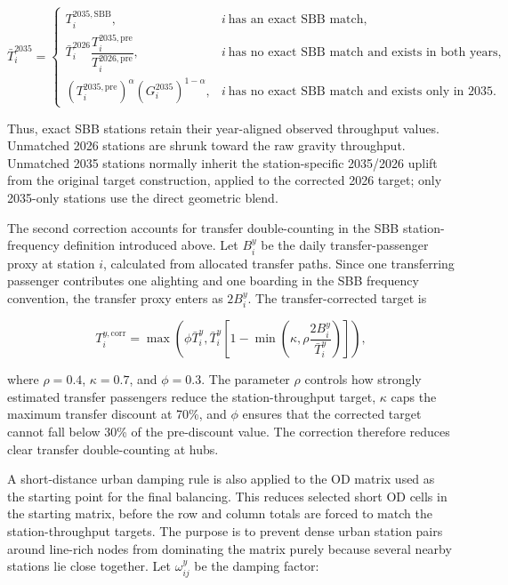 \documentclass[preprint,12pt]{elsarticle}
\begin{document}
\begin{equation}
\bar T_i^{2035}
=
\begin{cases}
T_i^{2035,\mathrm{SBB}}, & i\ \text{has an exact SBB match},\\[4pt]
\bar T_i^{2026}
\dfrac{T_i^{2035,\mathrm{pre}}}{T_i^{2026,\mathrm{pre}}},
& i\ \text{has no exact SBB match and exists in both years},\\[10pt]
\left(T_i^{2035,\mathrm{pre}}\right)^\alpha
\left(G_i^{2035}\right)^{1-\alpha},
& i\ \text{has no exact SBB match and exists only in 2035}.
\end{cases}
\label{eq:part2-unmatched-target-2035}
\end{equation}

Thus, exact SBB stations retain their year-aligned observed throughput values. Unmatched 2026 stations are shrunk toward the raw gravity throughput. Unmatched 2035 stations normally inherit the station-specific 2035/2026 uplift from the original target construction, applied to the corrected 2026 target; only 2035-only stations use the direct geometric blend.

The second correction accounts for transfer double-counting in the SBB station-frequency definition introduced above. Let \(B_i^y\) be the daily transfer-passenger proxy at station \(i\), calculated from allocated transfer paths. Since one transferring passenger contributes one alighting and one boarding in the SBB frequency convention, the transfer proxy enters as \(2B_i^y\). The transfer-corrected target is

\begin{equation}
T_i^{y,\mathrm{corr}}
=
\max\left(
\phi\bar T_i^y,
\bar T_i^y\left[
1-
\min\left(
\kappa,
\rho\frac{2B_i^y}{\bar T_i^y}
\right)
\right]
\right),
\label{eq:part2-transfer-target-correction}
\end{equation}

where \(\rho=0.4\), \(\kappa=0.7\), and \(\phi=0.3\). The parameter \(\rho\) controls how strongly estimated transfer passengers reduce the station-throughput target, \(\kappa\) caps the maximum transfer discount at 70\%, and \(\phi\) ensures that the corrected target cannot fall below 30\% of the pre-discount value. The correction therefore reduces clear transfer double-counting at hubs.

A short-distance urban damping rule is also applied to the OD matrix used as the starting point for the final balancing. This reduces selected short OD cells in the starting matrix, before the row and column totals are forced to match the station-throughput targets. The purpose is to prevent dense urban station pairs around line-rich nodes from dominating the matrix purely because several nearby stations lie close together. Let \(\omega_{ij}^y\) be the damping factor:
\end{document}
